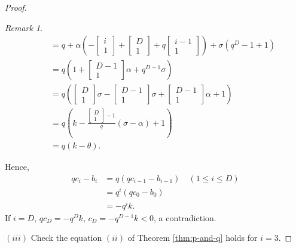 \documentclass[
]{book}
\theoremstyle{definition}
\theoremstyle{definition}
\theoremstyle{definition}
\theoremstyle{definition}
\theoremstyle{remark}
\newtheorem*{remark}{Remark}
\begin{document}
\begin{proof}
\begin{remark}
\begin{align}
& \quad = q+\alpha\left(-\begin{bmatrix}{i}\\{1}\end{bmatrix}+\begin{bmatrix}{D}\\{1}\end{bmatrix}+q\begin{bmatrix}{i-1}\\{1}\end{bmatrix}\right)+\sigma(q^D-1+1)\\
& \quad = q\left(1 + \begin{bmatrix}{D-1}\\{1}\end{bmatrix}\alpha + q^{D-1}\sigma\right)\\
& \quad = q\left(\begin{bmatrix}{D}\\{1}\end{bmatrix}\sigma - \begin{bmatrix}{D-1}\\{1}\end{bmatrix}\sigma + \begin{bmatrix}{D-1}\\{1}\end{bmatrix}\alpha + 1\right)\\
& \quad = q\left(k-\frac{\begin{bmatrix}{D}\\{1}\end{bmatrix}-1}{q}(\sigma-\alpha)+1\right)\\
& \quad = q(k-\theta).
\end{align}
\end{remark}

Hence,
\begin{align}
qc_i - b_i & = q(qc_{i-1}-b_{i-1})\quad (1\leq i\leq D)\\
& = q^i(qc_0 - b_0)\\
& = -q^ik.
\end{align}
If \(i = D\), \(qc_D = -q^Dk\), \(c_D = -q^{D-1}k < 0\), a contradiction.

\((iii)\) Check the equation \((ii)\) of Theorem \ref{thm:p-and-q} holds for \(i=3\).

\end{proof}
\end{document}
